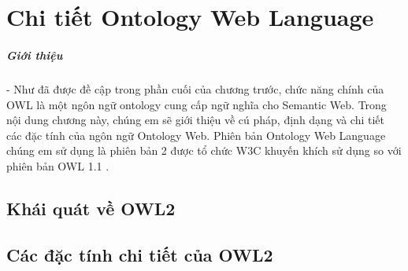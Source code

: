 \chapter{Chi tiết Ontology Web Language}
\paragraph{Giới thiệu } - Như đã được đề cập trong phần cuối của chương trước, chức năng chính của OWL là một ngôn ngữ ontology cung cấp ngữ nghĩa cho Semantic Web. Trong nội dung chương này, chúng em sẽ giới thiệu về cú pháp, định dạng và chi tiết các đặc tính của ngôn ngữ Ontology Web. Phiên bản Ontology Web Language chúng em sử dụng là phiên bản 2 được tổ chức W3C khuyến khích sử dụng so với phiên bản OWL 1.1 \cite{owl}.
\section{Khái quát về OWL2}
\subsection{}
\section{Các đặc tính chi tiết của OWL2}